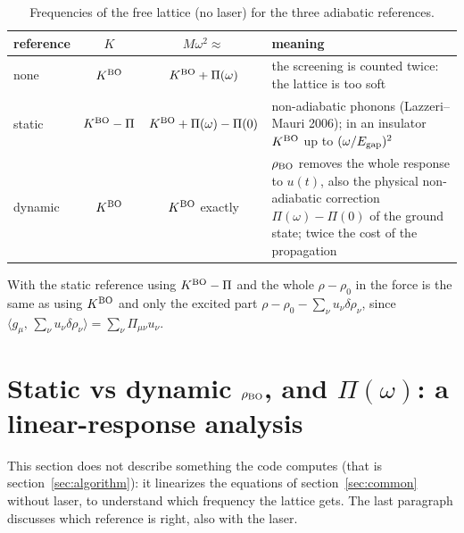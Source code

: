 \documentclass[11pt]{article}
\newcommand{\KBO}{K^{\rm BO}}
\newcommand{\rBO}{\rho_{\rm BO}}
\newcommand{\inner}[2]{\langle #1,\,#2\rangle}
\begin{document}
\begin{table}[h]
\centering
\renewcommand{\arraystretch}{1.4}
\begin{tabularx}{\textwidth}{@{}l c c L@{}}
\toprule
reference & $K$ & $M\omega^2 \approx$ & meaning \\
\midrule
none    & $\KBO$     & $\KBO + \Pi(\omega)$ & the screening is counted twice: the lattice is too soft \\
static  & $\KBO-\Pi$ & $\KBO + \Pi(\omega) - \Pi(0)$ & non-adiabatic phonons (Lazzeri--Mauri 2006); in an insulator
  $\KBO$ up to $(\omega/E_{\rm gap})^2$ \\
dynamic & $\KBO$     & $\KBO$ exactly & $\rBO$ removes the whole response to $u(t)$, also the physical
  non-adiabatic correction $\Pi(\omega)-\Pi(0)$ of the ground state; twice the cost of the propagation \\
\bottomrule
\end{tabularx}
\caption{Frequencies of the free lattice (no laser) for the three adiabatic references.}
\label{tab:reference}
\end{table}

With the static reference using $\KBO-\Pi$ and the whole $\rho-\rho_0$ in the force is the same as using $\KBO$ and
only the excited part $\rho-\rho_0-\sum_\nu u_\nu\delta\rho_\nu$, since
$\inner{g_\mu}{\sum_\nu u_\nu\delta\rho_\nu} = \sum_\nu \Pi_{\mu\nu}u_\nu$.

\section{\texorpdfstring{Static vs dynamic $\rho_{\rm BO}$, and $\Pi(\omega)$: a linear-response analysis}{Static vs dynamic rho\_BO, and Pi(omega): a linear-response analysis}}\label{sec:pi_omega}
This section does not describe something the code computes (that is section~\ref{sec:algorithm}): it linearizes the
equations of section~\ref{sec:common} without laser, to understand which frequency the lattice gets. The last
paragraph discusses which reference is right, also with the laser.
\end{document}
